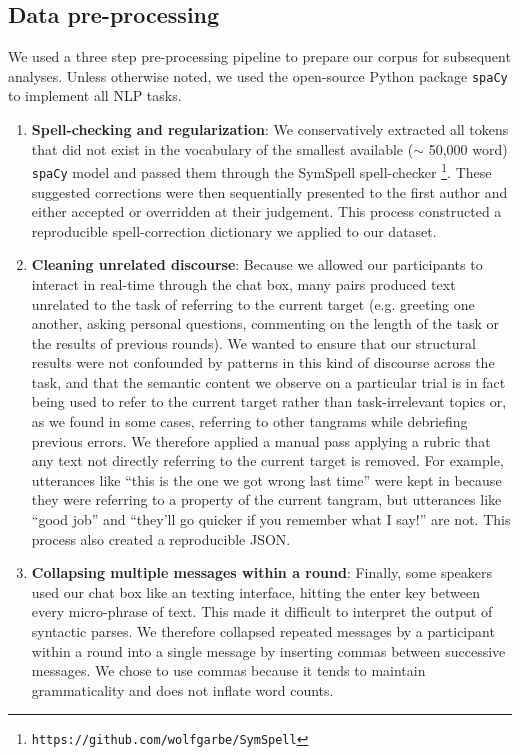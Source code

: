 \documentclass[alpha-refs]{wiley-article}
\begin{document}
\subsection{Data pre-processing}

We used a three step pre-processing pipeline to prepare our corpus for subsequent analyses. Unless otherwise noted, we used the open-source Python package \texttt{spaCy} to implement all NLP tasks. 

\begin{enumerate}

\item \textbf{Spell-checking and regularization}: We conservatively extracted all tokens that did not exist in the vocabulary of the smallest available ($\sim$ 50,000 word) \texttt{spaCy} model and passed them through the SymSpell spell-checker \footnote{\texttt{https://github.com/wolfgarbe/SymSpell}}. These suggested corrections were then sequentially presented to the first author and either accepted or overridden at their judgement. This process constructed a reproducible spell-correction dictionary we applied to our dataset.

\item \textbf{Cleaning unrelated discourse}: Because we allowed our participants to interact in real-time through the chat box, many pairs produced text unrelated to the task of referring to the current target (e.g. greeting one another, asking personal questions, commenting on the length of the task or the results of previous rounds). We wanted to ensure that our structural results were not confounded by patterns in this kind of discourse across the task, and that the semantic content we observe on a particular trial is in fact being used to refer to the current target rather than task-irrelevant topics or, as we found in some cases, referring to other tangrams while debriefing previous errors. We therefore applied a manual pass applying a rubric that any text not directly referring to the current target is removed. For example, utterances like ``this is the one we got wrong last time'' were kept in because they were referring to a property of the current tangram, but utterances like ``good job'' and ``they'll go quicker if you remember what I say!'' are not. This process also created a reproducible JSON.

\item \textbf{Collapsing multiple messages within a round}: Finally, some speakers used our chat box like an texting interface, hitting the enter key between every micro-phrase of text. This made it difficult to interpret the output of syntactic parses. We therefore collapsed repeated messages by a participant within a round into a single message by inserting commas between successive messages. We chose to use commas because it tends to maintain grammaticality and does not inflate word counts.

\end{enumerate}
\end{document}
